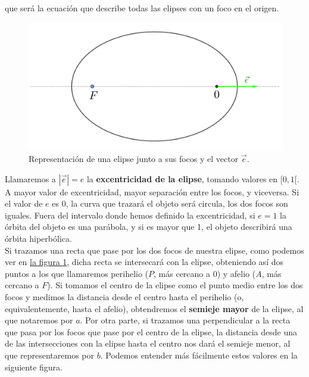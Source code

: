 \documentclass[11pt]{book}
\begin{document}
\noindent que será la ecuación que describe todas las elipses con un foco en el origen.\\

\begin{figure}[H]
\centering
\includegraphics[scale=0.12]{images/elipse_excentricidad.png}
\caption{Representación de una elipse junto a sus focos y el vector $\vec{e}$.}
\label{fig:elipse_excentricidad}
\end{figure}

Llamaremos a $|\vec{e}|=e$ la \textbf{excentricidad de la elipse}, tomando valores en $[0,1[$. A mayor valor de excentricidad, mayor separación entre los focos, y viceversa. Si el valor de $e$ es 0, la curva que trazará el objeto será circula, los dos focos son iguales. Fuera del intervalo donde hemos definido la excentricidad, si $e=1$ la órbita del objeto es una parábola, y si es mayor que 1, el objeto describirá una órbita hiperbólica.\\

Si trazamos una recta que pase por los dos focos de nuestra elipse, como podemos ver en \hyperref[fig:elipse_excentricidad]{la figura \ref{fig:elipse_excentricidad}}, dicha recta se intersecará con la elipse, obteniendo así dos puntos a los que llamaremos perihelio ($P$, más cercano a $0$) y afelio ($A$, más cercano a $F$). Si tomamos el centro de la elipse como el punto medio entre los dos focos y medimos la distancia desde el centro hasta el perihelio (o, equivalentemente, hasta el afelio), obtendremos el \textbf{semieje mayor} de la elipse, al que notaremos por $a$. Por otra parte, si trazamos una perpendicular a la recta que pasa por los focos que pase por el centro de la elipse, la distancia desde una de las intersecciones con la elipse hasta el centro nos dará el semieje menor, al que representaremos por $b$. Podemos entender más fácilmente estos valores en la siguiente figura.
\end{document}

